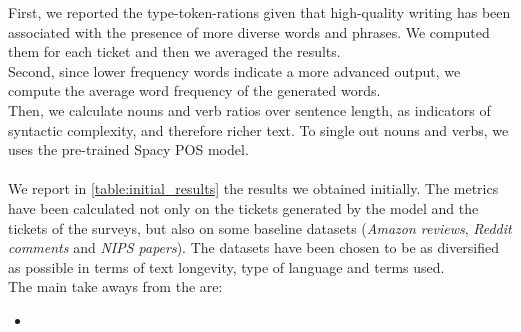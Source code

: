 First, we reported the type-token-rations given that high-quality writing has been associated with the presence of more diverse words and phrases\cite{pitler2008revisiting}. We computed them for each ticket and then we averaged the results. \\
Second, since lower frequency words indicate a more advanced output\cite{crossley2011development}, we compute the average word frequency of the generated words.\\
Then, we calculate nouns and verb ratios over sentence length, as indicators of syntactic complexity, and therefore richer text\cite{mcnamara2010linguistic}. To single out nouns and verbs, we uses the pre-trained Spacy POS model. \\\\
We report in \autoref{table:initial_results} the results we obtained initially. The metrics have been calculated not only on the tickets generated by the model and the tickets of the surveys, but also on some baseline datasets (\textit{Amazon reviews}, \textit{Reddit comments} and \textit{NIPS papers}). The datasets have been chosen to be as diversified as possible in terms of text longevity, type of language and terms used. \\ %
The main take aways from the are:
\begin{itemize}
    \item 
\end{itemize}

